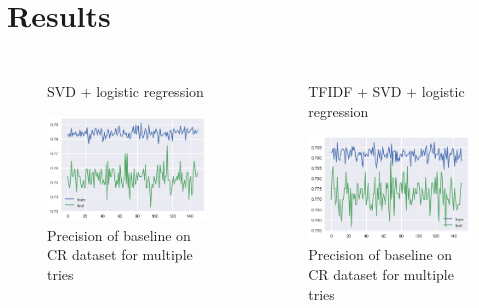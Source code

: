 \documentclass[xcolor={table}]{beamer}
\begin{document}
\section{Results}
\begin{frame}{}
	\begin{columns}
   				\begin{figure}[H]
        			\centering
        			\caption*{SVD + logistic regression}
        			\includegraphics[height=0.4\textheight]{images/CRDataset.png}
        			\caption{Precision of baseline on CR dataset for multiple tries}
        		\end{figure}

        		\begin{figure}[H]
        			\centering
        			\caption*{TFIDF + SVD + logistic regression}
        			\includegraphics[height=0.4\textheight]{images/CRDataset_tfidf.png}
        			\caption{Precision of baseline on CR dataset for multiple tries}
        		\end{figure}
	\end{columns}
        		
\end{frame} 
\end{document}
